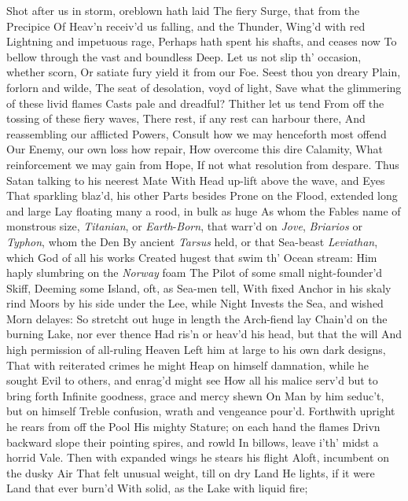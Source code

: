 \documentclass[11pt]{book}
\begin{document}
Shot after us in storm, oreblown hath laid 
The fiery Surge, that from the Precipice 
Of Heav'n receiv'd us falling, and the Thunder, 
Wing'd with red Lightning and impetuous rage, 
Perhaps hath spent his shafts, and ceases now 
To bellow through the vast and boundless Deep. 
Let us not slip th' occasion, whether scorn, 
Or satiate fury yield it from our Foe. 
Seest thou yon dreary Plain, forlorn and wilde, 
The seat of desolation, voyd of light, 
Save what the glimmering of these livid flames 
Casts pale and dreadful?  Thither let us tend 
From off the tossing of these fiery waves, 
There rest, if any rest can harbour there, 
And reassembling our afflicted Powers, 
Consult how we may henceforth most offend 
Our Enemy, our own loss how repair, 
How overcome this dire Calamity, 
What reinforcement we may gain from Hope, 
If not what resolution from despare. 
\quad Thus Satan talking to his neerest Mate 
With Head up-lift above the wave, and Eyes 
That sparkling blaz'd, his other Parts besides 
Prone on the Flood, extended long and large 
Lay floating many a rood, in bulk as huge 
As whom the Fables name of monstrous size, 
\textit{Titanian}, or \textit{Earth}-\textit{Born}, that warr'd on \textit{Jove}, 
\textit{Briarios} or \textit{Typhon}, whom the Den 
By ancient \textit{Tarsus} held, or that Sea-beast 
\textit{Leviathan}, which God of all his works 
Created hugest that swim th' Ocean stream: 
Him haply slumbring on the \textit{Norway} foam 
The Pilot of some small night-founder'd Skiff, 
Deeming some Island, oft, as Sea-men tell, 
With fixed Anchor in his skaly rind 
Moors by his side under the Lee, while Night 
Invests the Sea, and wished Morn delayes: 
So stretcht out huge in length the Arch-fiend lay 
Chain'd on the burning Lake, nor ever thence 
Had ris'n or heav'd his head, but that the will 
And high permission of all-ruling Heaven 
Left him at large to his own dark designs, 
That with reiterated crimes he might 
Heap on himself damnation, while he sought 
Evil to others, and enrag'd might see 
How all his malice serv'd but to bring forth 
Infinite goodness, grace and mercy shewn 
On Man by him seduc't, but on himself 
Treble confusion, wrath and vengeance pour'd. 
Forthwith upright he rears from off the Pool 
His mighty Stature; on each hand the flames 
Drivn backward slope their pointing spires, and rowld 
In billows, leave i'th' midst a horrid Vale. 
Then with expanded wings he stears his flight 
Aloft, incumbent on the dusky Air 
That felt unusual weight, till on dry Land 
He lights, if it were Land that ever burn'd 
With solid, as the Lake with liquid fire; 
\end{document}
